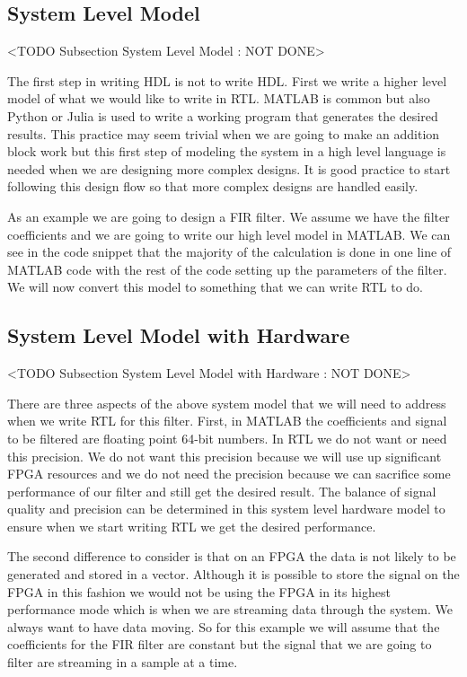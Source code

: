 \subsection{System Level Model}
	<TODO Subsection System Level Model : NOT DONE>

The first step in writing \ac{HDL} is not to write \ac{HDL}. First we write a higher level model of what we would like to write in \ac{RTL}. MATLAB is common but also Python or Julia is used to write a working program that generates the desired results. This practice may seem trivial when we are going to make an addition block work but this first step of modeling the system in a high level language is needed when we are designing more complex designs. It is good practice to start following this design flow so that more complex designs are handled easily.

As an example we are going to design a \ac{FIR} filter. We assume we have the filter coefficients and we are going to write our high level model in MATLAB. We can see in the code snippet that the majority of the calculation is done in one line of MATLAB code with the rest of the code setting up the parameters of the filter. We will now convert this model to something that we can write \ac{RTL} to do.
	
\subsection{System Level Model with Hardware}
	<TODO Subsection System Level Model with Hardware : NOT DONE>

There are three aspects of the above system model that we will need to address when we write \ac{RTL} for this filter. First, in MATLAB the coefficients and signal to be filtered are floating point 64-bit numbers. In \ac{RTL} we do not want or need this precision. We do not want this precision because we will use up significant \ac{FPGA} resources and we do not need the precision because we can sacrifice some performance of our filter and still get the desired result. The balance of signal quality and precision can be determined in this system level hardware model to ensure when we start writing \ac{RTL} we get the desired performance.

The second difference to consider is that on an \ac{FPGA} the data is not likely to be generated and stored in a vector. Although it is possible to store the signal on the \ac{FPGA} in this fashion we would not be using the \ac{FPGA} in its highest performance mode which is when we are streaming data through the system. We always want to have data moving. So for this example we will assume that the coefficients for the \ac{FIR} filter are constant but the signal that we are going to filter are streaming in a sample at a time.

